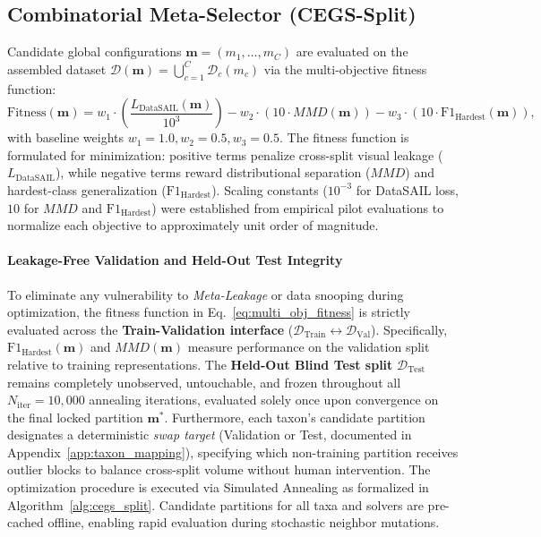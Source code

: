 \documentclass[a4paper,fleqn]{cas-sc}
\begin{document}
\subsection{Combinatorial Meta-Selector (CEGS-Split)}
Candidate global configurations $\boldsymbol{m} = (m_1, \dots, m_C)$ are evaluated on the assembled dataset $\mathcal{D}(\boldsymbol{m}) = \bigcup_{c=1}^{C} \mathcal{D}_c(m_c)$ via the multi-objective fitness function:
\begin{equation}
\mathrm{Fitness}(\boldsymbol{m}) = w_1 \cdot \left( \frac{L_{\text{DataSAIL}}(\boldsymbol{m})}{10^3} \right) - w_2 \cdot \left( 10 \cdot MMD(\boldsymbol{m}) \right) - w_3 \cdot \left( 10 \cdot \mathrm{F1}_{\text{Hardest}}(\boldsymbol{m}) \right),
\label{eq:multi_obj_fitness}
\end{equation}
with baseline weights $w_1=1.0, w_2=0.5, w_3=0.5$. The fitness function is formulated for minimization: positive terms penalize cross-split visual leakage ($L_{\text{DataSAIL}}$), while negative terms reward distributional separation ($MMD$) and hardest-class generalization ($\mathrm{F1}_{\text{Hardest}}$). Scaling constants ($10^{-3}$ for DataSAIL loss, $10$ for $MMD$ and $\mathrm{F1}_{\text{Hardest}}$) were established from empirical pilot evaluations to normalize each objective to approximately unit order of magnitude.

\paragraph{Leakage-Free Validation and Held-Out Test Integrity}
To eliminate any vulnerability to \emph{Meta-Leakage} or data snooping during optimization, the fitness function in Eq.~\eqref{eq:multi_obj_fitness} is strictly evaluated across the \textbf{Train-Validation interface} ($\mathcal{D}_{\text{Train}} \leftrightarrow \mathcal{D}_{\text{Val}}$). Specifically, $\mathrm{F1}_{\text{Hardest}}(\boldsymbol{m})$ and $MMD(\boldsymbol{m})$ measure performance on the validation split relative to training representations. The \textbf{Held-Out Blind Test split} $\mathcal{D}_{\text{Test}}$ remains completely unobserved, untouchable, and frozen throughout all $N_{\text{iter}} = 10{,}000$ annealing iterations, evaluated solely once upon convergence on the final locked partition $\boldsymbol{m}^*$. Furthermore, each taxon's candidate partition designates a deterministic \emph{swap target} (Validation or Test, documented in Appendix~\ref{app:taxon_mapping}), specifying which non-training partition receives outlier blocks to balance cross-split volume without human intervention. The optimization procedure is executed via Simulated Annealing as formalized in Algorithm~\ref{alg:cegs_split}. Candidate partitions for all taxa and solvers are pre-cached offline, enabling rapid evaluation during stochastic neighbor mutations.
\end{document}
